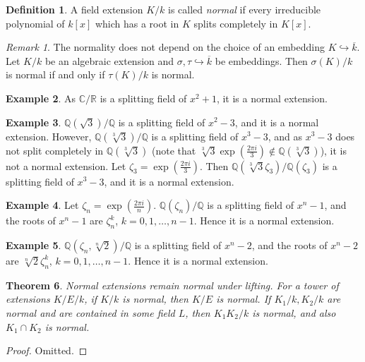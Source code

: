 \documentclass[12pt]{report}
\theoremstyle{plain}
\newtheorem{theorem}{Theorem}[section]
\theoremstyle{remark}
\newtheorem*{remark}{Remark}
\theoremstyle{definition}
\newtheorem{definition}[theorem]{Definition}
\newtheorem{example}[theorem]{Example}
\newcommand{\Q}{\mathbb{Q}}
\newcommand{\R}{\mathbb{R}}
\newcommand{\C}{\mathbb{C}}
\begin{document}
\begin{definition}
    A field extension $K/k$ is called \emph{normal} if every irreducible polynomial of $k[x]$ which has a root in $K$ splits completely in $K[x]$.
\end{definition}
\begin{remark}
    The normality does not depend on the choice of an embedding $K\hookrightarrow \overline{k}$. Let $K/k$ be an algebraic extension and $\sigma,\tau\hookrightarrow\overline{k}$ be embeddings. Then $\sigma(K)/k$ is normal if and only if $\tau(K)/k$ is normal.
\end{remark}

\begin{example}
    As $\C/\R$ is a splitting field of $x^2+1$, it is a normal extension.
\end{example}

\begin{example}
    $\Q(\sqrt{3})/\Q$ is a splitting field of $x^2-3$, and it is a normal extension. However, $\Q(\sqrt[3]{3})/\Q$ is a splitting field of $x^3-3$, and as $x^3-3$ does not split completely in $\Q(\sqrt[3]{3})$ (note that $\sqrt[3]{3}\exp \left( \frac{2\pi i}{3} \right)\notin \Q(\sqrt[3]{3})$), it is not a normal extension. Let $\zeta_3=\exp \left( \frac{2\pi i}{3} \right)$. Then $\Q(\sqrt[3]{3}\zeta_3)/\Q(\zeta_3)$ is a splitting field of $x^3-3$, and it is a normal extension.
\end{example}

\begin{example}
    Let $\zeta_n = \exp \left( \frac{2\pi i}{n} \right)$. $\Q(\zeta_n)/\Q$ is a splitting field of $x^n-1$, and the roots of $x^n-1$ are $\zeta_n^k$, $k=0,1,\dots,n-1$. Hence it is a normal extension.
\end{example}

\begin{example}
    $\Q(\zeta_n,\sqrt[n]{2})/\Q$ is a splitting field of $x^n-2$, and the roots of $x^n-2$ are $\sqrt[n]{2}\zeta_n^k$, $k=0,1,\dots,n-1$. Hence it is a normal extension.
\end{example}

\begin{theorem}
    Normal extensions remain normal under lifting. For a tower of extensions $K/E/k$, if $K/k$ is normal, then $K/E$ is normal. If $K_1/k, K_2/k$ are normal and are contained in some field $L$, then $K_1K_2/k$ is normal, and also $K_1\cap K_2$ is normal.
\end{theorem}
\begin{proof}
    Omitted.
\end{proof}
\end{document}
